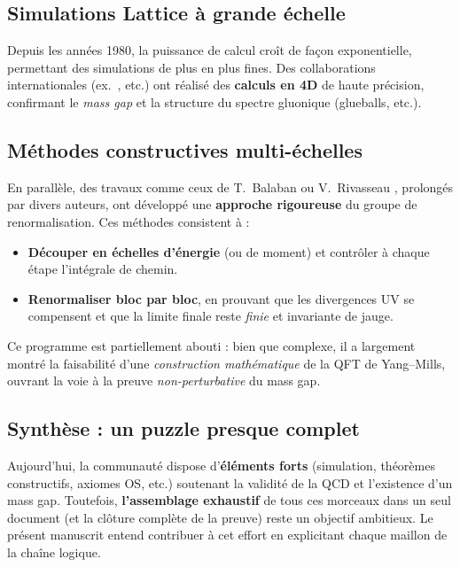 \subsection*{Simulations Lattice à grande échelle}
Depuis les années 1980, la puissance de calcul croît de façon exponentielle, permettant des simulations de plus en plus fines. Des collaborations internationales (ex.~\cite{UkqcdRbcCollab}, etc.) ont réalisé des \textbf{calculs en 4D} de haute précision, confirmant le \emph{mass gap} et la structure du spectre gluonique (glueballs, etc.).  

\subsection*{Méthodes constructives multi-échelles}
En parallèle, des travaux comme ceux de T.~Balaban \cite{Balaban1982-1,Balaban1982-2} ou V.~Rivasseau \cite{Rivasseau1991}, prolongés par divers auteurs, ont développé une \textbf{approche rigoureuse} du \og groupe de renormalisation\fg. Ces méthodes consistent à :
\begin{itemize}
	\item \textbf{Découper en échelles d’énergie} (ou de moment) et contrôler à chaque étape l’intégrale de chemin.  
	\item \textbf{Renormaliser bloc par bloc}, en prouvant que les divergences UV se compensent et que la limite finale reste \emph{finie} et invariante de jauge.
\end{itemize}
Ce programme est partiellement abouti : bien que complexe, il a largement montré la faisabilité d’une \textit{construction mathématique} de la QFT de Yang--Mills, ouvrant la voie à la preuve \emph{non-perturbative} du mass gap.

\subsection*{Synthèse : un puzzle presque complet}
Aujourd’hui, la communauté dispose d’\textbf{éléments forts} (simulation, théorèmes constructifs, axiomes OS, etc.) soutenant la validité de la QCD et l’existence d’un mass gap. Toutefois, \textbf{l’assemblage exhaustif} de tous ces morceaux dans un seul document (et la clôture complète de la preuve) reste un objectif ambitieux. Le présent manuscrit entend contribuer à cet effort en explicitant chaque maillon de la chaîne logique.

\vspace{2em}

